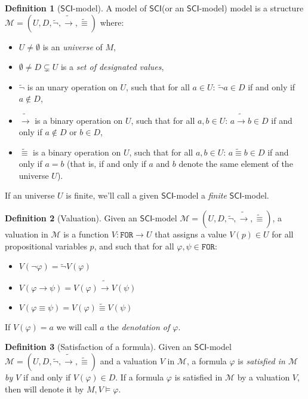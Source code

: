 \documentclass{article}
\theoremstyle{definition}
\newtheorem{definition}{Definition}[section]
\newcommand*{\id}{\equiv}
\newcommand*{\ra}{\rightarrow}
\newcommand*{\FOR}{\texttt{FOR}}
\newcommand{\SCI}{$\mathsf{SCI}$\xspace}
\begin{document}
\begin{definition}[\SCI-model]
    A model of \SCI (or an \SCI-model) model is a structure $\mathcal{M} = (U, D, \tilde{\lnot}, \tilde{\ra}, \tilde{\id})$ where:
    \begin{itemize}
        \item $U \not = \emptyset$ is an \emph{universe} of $M$,
        \item $\emptyset \not = D \subsetneq U$ is a \emph{set of designated values},
        \item $\tilde{\lnot}$ is an unary operation on $U$, such that for all $a \in U$: $\tilde{\lnot}a \in D$ if and only if $a \not \in D$,
        \item $\tilde{\ra}$ is a binary operation on $U$, such that for all $a, b \in U$: $a \tilde{\ra} b \in D$ if and only if $a \not \in D$ or $b \in D$,
        \item $\tilde{\id}$ is a binary operation on $U$, such that for all $a, b \in U$: $a \tilde{\id} b \in D$ if and only if $a = b$ (that is, if and only if $a$ and $b$ denote the same element of the universe $U$).
    \end{itemize}
    \label{model}
\end{definition}

If an universe $U$ is finite, we'll call a given \SCI-model a \emph{finite}
\SCI-model.

\begin{definition}[Valuation]
    Given an \SCI-model $\mathcal{M} = (U, D, \tilde{\lnot}, \tilde{\ra}, \tilde{\id})$, a valuation in $\mathcal{M}$ is a function $V : \FOR \longrightarrow U$ that assigns a value $V(p) \in U$ for all propositional variables $p$, and such that for all $\varphi, \psi \in \FOR$:
    \begin{itemize}
        \item $V(\lnot \varphi) = \tilde{\lnot}V(\varphi)$
        \item $V(\varphi \ra \psi) = V(\varphi) \tilde{\ra} V(\psi)$
        \item $V(\varphi \id \psi) = V(\varphi) \tilde{\id} V(\psi)$
    \end{itemize}
    If $V(\varphi) = a$ we will call $a$ the \emph{denotation of $\varphi$}.
    \label{valuation}
\end{definition}

\begin{definition}[Satisfaction of a formula]
    Given an \SCI-model $\mathcal{M} = (U, D, \tilde{\lnot}, \tilde{\ra}, \tilde{\id})$ and a valuation $V$ in $\mathcal{M}$, a formula $\varphi$ is \emph{satisfied in $\mathcal{M}$ by $V$} if and only if $V(\varphi) \in D$. If a formula $\varphi$ is satisfied in $\mathcal{M}$ by a valuation $V$, then will denote it by $M, V \models \varphi$.
\end{definition}
\end{document}
